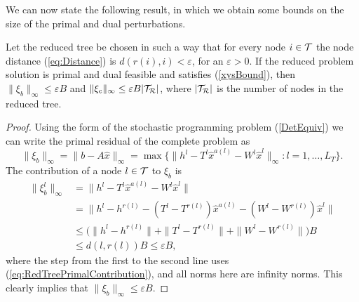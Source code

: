We can now state the following result, in which we obtain some bounds
on the size of the primal and dual perturbations.
%
\begin{lemma}  \label{th:BoundResiduals}
Let the reduced tree be chosen in such a way that for every node 
$i \in \mathcal{T}$ the node distance (\ref{eq:Distance}) is 
$d(r(i), i) < \varepsilon$, for an $\varepsilon > 0$.
If the reduced problem solution is primal and dual feasible  
and satisfies (\ref{xysBound}), then
$\| \xi_b \|_{\infty} \leq \varepsilon B$
and  $\| \xi_c \|_{\infty} \leq \varepsilon B|\mathcal{T}_\mathcal{R}|$, where
$|\mathcal{T}_\mathcal{R}|$ is the number of nodes in the reduced tree.
\end{lemma} 
%
\begin{proof}
Using the form of the stochastic programming problem (\ref{DetEquiv})
we can write the primal residual of the complete problem as
\[
  \|\xi_b\|_\infty = \|b-A\hat x\|_\infty 
                   = \max\{\|h^{l} - T^{l}\hat x^{a(l)} 
                     - W^{l}\hat x^{l}\|_\infty:l = 1,\ldots,L_T\}.
\]
%
The contribution of a node $l \in \mathcal{T}$ to $\xi_b$ is 
\[
\begin{split}
  \| \xi_b^{l} \|_{\infty}
    & = \|h^{l}\!-\!T^{l}\hat x^{a(l)}\!-\!W^{l}\hat x^{l}\| \\
    & = \|h^{l} \!-\! h^{r(l)} - (T^{l} \!- T^{r(l)})\hat x^{a(l)}
        - (W^{l} - W^{r(l)}) \hat x^{l}\| \\
    & \le \big( \|h^{l} \! - \! h^{r(l)}\| +
           \|T^{l} \! - \! T^{r(l)}\| +
           \|W^{l} \! - \! W^{r(l)}\| \big) B \\
    & \le  d(l, r(l)) B \le \varepsilon B,
\end{split}
\]
where the step from the first to the second line uses 
(\ref{eq:RedTreePrimalContribution}), and all norms here 
are infinity norms.
%
This clearly implies that $\| \xi_b \|_\infty \le \varepsilon B$. 


\end{proof}
